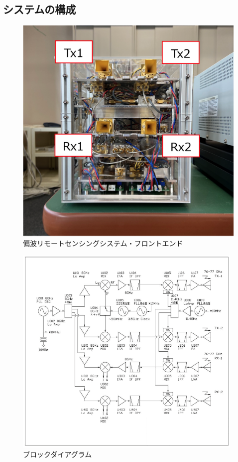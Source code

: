 \documentclass[uplatex,a4paper,12pt]{jsarticle}
\begin{document}
\subsection{システムの構成}
\begin{figure}[hbtp]
	\centering
	\includegraphics[scale=0.3]{../img/system.png}
    \caption{偏波リモートセンシングシステム・フロントエンド}
	\label{fig:system}
\end{figure}
\begin{figure}[hbtp]
	\centering
	\includegraphics[width=110mm]{../img/diagram.png}
    \caption{ブロックダイアグラム}
	\label{fig:diagram}
\end{figure}
\end{document}
